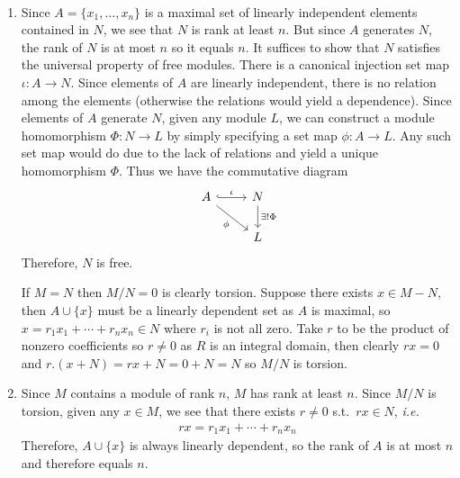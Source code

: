 \documentclass[12pt]{article}
\begin{document}
\begin{problem}[2]
~\begin{enumerate}[label=(\alph*)]
	\item Since $A = \{x_1,\ldots,x_n\}$ is a maximal set of linearly independent elements contained in $ N$, we see that $ N$ is rank at least $ n$. But since $ A$ generates  $ N$,  the rank of $ N$ is at most  $ n$ so it equals  $ n$. It suffices to show that $ N$ satisfies the universal property of free modules. There is a canonical injection set map $ \iota : A \to N$. Since elements of $ A$ are linearly independent, there is no relation among the elements (otherwise the relations would yield a dependence). Since elements of $ A$ generate $ N$, given any module $ L$, we can construct a module homomorphism $ \Phi: N \to L$ by simply specifying a set map $ \phi: A \to L$. Any such set map would do due to the lack of relations and yield a unique homomorphism $ \Phi$. Thus we have the commutative diagram
\[\begin{tikzcd}
	A & N \\
	& L
	\arrow["\iota", hook, from=1-1, to=1-2]
	\arrow["{\exists !\Phi}", from=1-2, to=2-2]
	\arrow["\phi"', from=1-1, to=2-2]
\end{tikzcd}\]
Therefore, $ N$ is free.

If  $ M = N$ then  $ M /N = 0$ is clearly torsion. Suppose there exists  $ x \in M -N$, then $ A \cup \{x\}$ must be a linearly dependent set as $ A$ is maximal, so  $ x = r_1 x_1 + \cdots + r_n x_n \in N$ where $ r_i$ is not all zero. Take $ r$ to be the product of nonzero coefficients so $ r \neq 0$ as  $ R$ is an integral domain, then clearly $ rx = 0$ and $ r.(x+N) = rx+N = 0+N = N$ so $ M /N$ is torsion.
\item Since $ M$ contains a module of rank  $ n$,  $ M$ has rank at least  $ n$. Since  $ M /N$ is torsion, given any $ x \in M$, we see that there exists $ r \neq 0$  s.t.\ $rx  \in N$, \emph{i.e.} 
	\begin{align*}
		r x = r_1 x_1 + \cdots + r_n x_n
	\end{align*}
	Therefore, $ A \cup \{x\}$ is always linearly dependent, so the rank of $ A$ is at most  $ n$ and therefore equals  $ n$.
\end{enumerate}
\end{problem}
\end{document}
